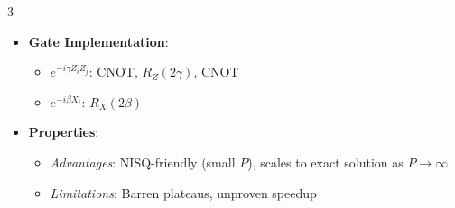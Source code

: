 \begin{multicols}{3}
\begin{itemize}[leftmargin=*,nosep,topsep=0pt]
\[{\begin{quantikz}
              \lstick{$q_1$} & \gate{H} & \gate[2]{Z Z} & \qw & \gate{R_X(2\beta)} & \meter{} \\
              \lstick{$q_2$} & \gate{H} & \qw & \gate[2]{Z Z} & \gate{R_X(2\beta)} & \meter{} \\
              \lstick{$q_3$} & \gate{H} & \qw & \qw & \gate{R_X(2\beta)} & \meter{}
            \end{quantikz}
          }
        \]
      \item \textbf{Gate Implementation}:
        \begin{itemize}[nosep]
          \item $e^{-i\gamma Z_i Z_j}$: CNOT, $R_Z(2\gamma)$, CNOT
          \item $e^{-i\beta X_i}$: $R_X(2\beta)$
        \end{itemize}
      \item \textbf{Properties}:
        \begin{itemize}[nosep]
          \item \textit{Advantages}: NISQ-friendly (small $P$), scales to
            exact solution as $P \to \infty$
          \item \textit{Limitations}: Barren plateaus, unproven speedup
        \end{itemize}
    \end{itemize}



\end{multicols}
